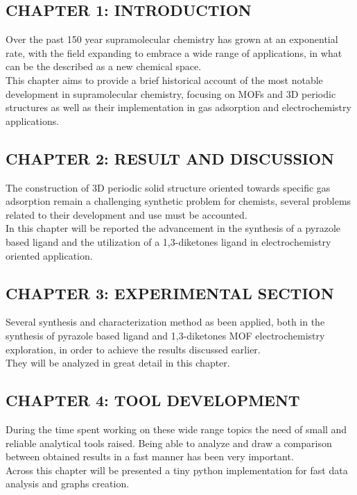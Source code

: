 \documentclass[a4,11pt]{report}
\begin{document}
\subsection*{CHAPTER 1: INTRODUCTION}
Over the past 150 year supramolecular chemistry has grown at an exponential rate, with the field expanding to embrace a wide range of applications, in what can be the described as a new chemical space.\\
This chapter aims to provide a brief historical account of the most notable development in supramolecular chemistry, focusing on MOFs and 3D periodic structures as well as their implementation in gas adsorption and electrochemistry applications.
\newline\subsection*{CHAPTER 2: RESULT AND DISCUSSION}
The construction of 3D periodic solid structure oriented towards specific gas adsorption remain a challenging synthetic problem for chemists, several problems related to their development and use must be accounted.\\
In this chapter will be reported the advancement in the synthesis of a pyrazole based ligand and the utilization of a 1,3-diketones ligand in electrochemistry oriented application.
\newline\subsection*{CHAPTER 3: EXPERIMENTAL SECTION}
Several synthesis and characterization method as been applied, both in the synthesis of pyrazole based ligand and 1,3-diketones MOF electrochemistry exploration, in order to achieve the results discussed earlier. \\
They will be analyzed in great detail in this chapter.
\newline\subsection*{CHAPTER 4: TOOL DEVELOPMENT}
During the time spent working on these wide range topics the need of small and reliable analytical tools raised. Being able to analyze and draw a comparison between obtained results in a fast manner has been very important. \\
Across this chapter will be presented a tiny python implementation for fast data analysis and graphs creation.

\newpage
\tableofcontents









\end{document}
